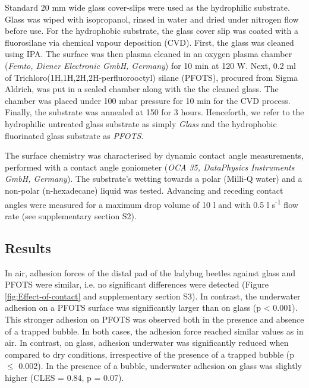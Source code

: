 \documentclass[vruler,JEB]{COB}%
\begin{document}
Standard 20 mm wide glass cover-slips were used as the hydrophilic
substrate. Glass was wiped with isopropanol, rinsed in water and dried
under nitrogen flow before use. For the hydrophobic substrate, the glass cover slip was coated with
a fluorosilane via chemical vapour deposition (CVD). First, the glass
was cleaned using IPA. The surface was then plasma cleaned in an oxygen
plasma chamber (\emph{Femto, Diener Electronic GmbH, Germany}) for 10 min at 120 W. Next, 0.2 ml of
Trichloro(1H,1H,2H,2H-perfluorooctyl) silane (PFOTS), procured from
Sigma Aldrich, was put in a sealed chamber along with the the cleaned
glass. The chamber was placed under 100 mbar pressure for 10 min for
the CVD process. Finally, the substrate was annealed at 150 \textcelsius{}
for 3 hours. Henceforth, we refer to the hydrophilic untreated glass substrate 
as simply \emph{Glass} and the hydrophobic fluorinated glass substrate as \emph{PFOTS}.

The surface chemistry was characterised by dynamic contact angle
measurements, performed with a contact angle goniometer (\emph{OCA 35, DataPhysics Instruments GmbH, Germany}).
The substrate's wetting towards a polar (Milli-Q water) and a non-polar (n-hexadecane) liquid was tested. Advancing
and receding contact angles were measured for a maximum drop volume
of 10 \textmu l and with 0.5 \textmu l s\protect\textsuperscript{-1} flow rate (see supplementary section S2).

\subsection{Results}


In air, adhesion forces of the distal pad of the ladybug beetles against
glass and PFOTS were similar, i.e. no significant differences were
detected (Figure \ref{fig:Effect-of-contact} and supplementary section S3).
In contrast, the underwater adhesion on a PFOTS surface was significantly
larger than on glass (p < 0.001). This stronger adhesion on PFOTS
was observed both in the presence and absence of a trapped bubble.
In both cases, the adhesion force reached similar values as in air. In contrast,
on glass, adhesion underwater was significantly reduced when compared
to dry conditions, irrespective of the presence of a trapped bubble
(p $\leq$ 0.002). In the presence of a bubble, underwater adhesion on glass was slightly higher (CLES = 0.84, p = 0.07).
\end{document}
